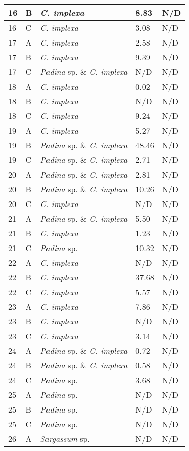 \documentclass[12pt]{article}
\begin{document}
\begin{longtable}{ | p{1cm} | p{1cm} | p{3cm} | p{4cm} | p{4cm} | }
\hline
16&B&\emph{C. implexa}&8.83
&N/D\\
\hline
16&C&\emph{C. implexa}&3.08
&N/D\\
\hline
17&A&\emph{C. implexa}&2.58
&N/D\\
\hline
17&B&\emph{C. implexa}&9.39
&N/D\\
\hline
17&C&\emph{Padina} sp. \& \emph{C. implexa}&N/D&N/D\\
\hline
18&A&\emph{C. implexa}&0.02
&N/D\\
\hline
18&B&\emph{C. implexa}&N/D&N/D\\
\hline
18&C&\emph{C. implexa}&9.24
&N/D\\
\hline
19&A&\emph{C. implexa}&5.27
&N/D\\
\hline
19&B&\emph{Padina} sp. \& \emph{C. implexa}&48.46
&N/D\\
\hline
19&C&\emph{Padina} sp. \& \emph{C. implexa}&2.71
&N/D\\
\hline
20&A&\emph{Padina} sp. \& \emph{C. implexa}&2.81
&N/D\\
\hline
20&B&\emph{Padina} sp. \& \emph{C. implexa}&10.26
&N/D\\
\hline
20&C&\emph{C. implexa}&N/D&N/D\\
\hline
21&A&\emph{Padina} sp. \& \emph{C. implexa}&5.50
&N/D\\
\hline
21&B&\emph{C. implexa}&1.23
&N/D\\
\hline
21&C&\emph{Padina} sp.&10.32
&N/D\\
\hline
22&A&\emph{C. implexa}&N/D&N/D\\
\hline
22&B&\emph{C. implexa}&37.68
&N/D\\
\hline
22&C&\emph{C. implexa}&5.57
&N/D\\
\hline
23&A&\emph{C. implexa}&7.86
&N/D\\
\hline
23&B&\emph{C. implexa}&N/D&N/D\\
\hline
23&C&\emph{C. implexa}&3.14
&N/D\\
\hline
24&A&\emph{Padina} sp. \& \emph{C. implexa}&0.72
&N/D\\
\hline
24&B&\emph{Padina} sp. \& \emph{C. implexa}&0.58
&N/D\\
\hline
24&C&\emph{Padina} sp.&3.68
&N/D\\
\hline
25&A&\emph{Padina} sp.&N/D&N/D\\
\hline
25&B&\emph{Padina} sp.&N/D&N/D\\
\hline
25&C&\emph{Padina} sp.&N/D&N/D\\
\hline
26&A&\emph{Sargassum} sp.&N/D&N/D\\

\end{longtable}
\end{document}
